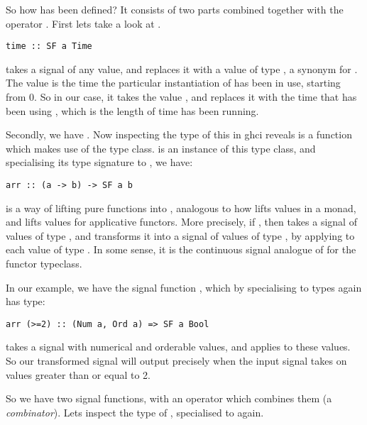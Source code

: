 So how has  been defined? It consists of two parts combined together with the operator \hask{>>>}. First lets take a look at .

\begin{lstlisting}
time :: SF a Time
\end{lstlisting}

\noindent {} takes a signal of any value, and replaces it with a value of type , a synonym for . The value is the time the particular instantiation of  has been in use, starting from $0$. So in our case, it takes the value \hask{()}, and replaces it with the time that \yampaMain has been using , which is the length of time \yampaMain has been running.

Secondly, we have . Now inspecting the type of this in ghci reveals  is a function which makes use of the  type class.  is an instance of this type class, and specialising its type signature to , we have:

\begin{lstlisting}
arr :: (a -> b) -> SF a b 
\end{lstlisting}

\noindent {} is a way of lifting pure functions into , analogous to how  lifts values in a monad, and  lifts values for applicative functors. More precisely, if , then  takes a signal of values of type , and transforms it into a signal of values of type , by applying  to each value of type . In some sense, it is the continuous signal analogue of  for the functor typeclass.

In our example, we have the signal function , which by specialising to types  again has type:

\begin{lstlisting}
arr (>=2) :: (Num a, Ord a) => SF a Bool
\end{lstlisting}

\noindent {} takes a signal with numerical and orderable values, and applies  to these values. So our transformed signal will output  precisely when the input signal takes on values greater than or equal to 2.

So we have two signal functions, with an operator which combines them (a \emph{combinator}). Lets inspect the type of \hask{>>>}, specialised to  again.

